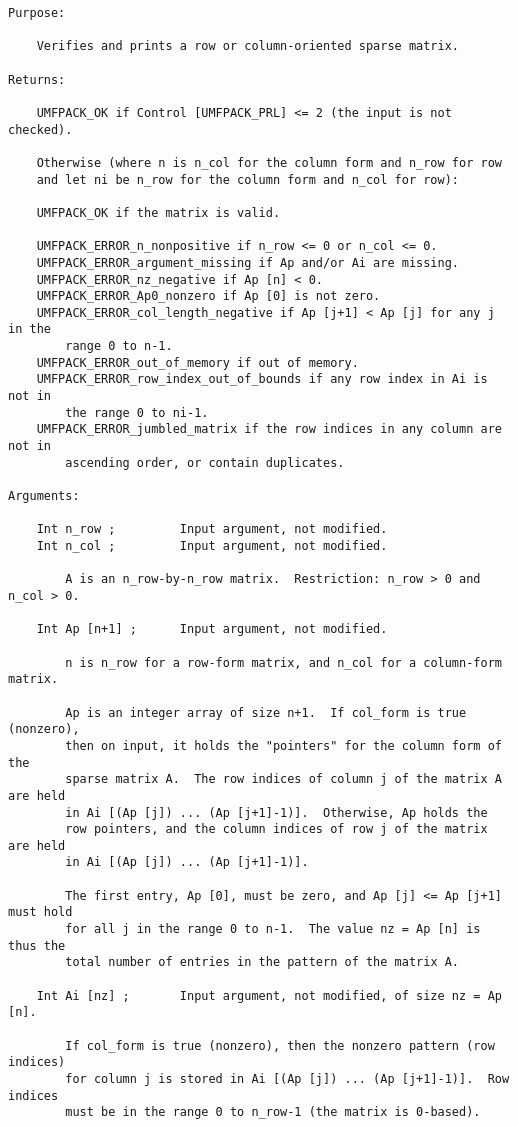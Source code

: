 {\begin{verbatim}
Purpose:

    Verifies and prints a row or column-oriented sparse matrix.

Returns:

    UMFPACK_OK if Control [UMFPACK_PRL] <= 2 (the input is not checked).

    Otherwise (where n is n_col for the column form and n_row for row
    and let ni be n_row for the column form and n_col for row):

    UMFPACK_OK if the matrix is valid.

    UMFPACK_ERROR_n_nonpositive if n_row <= 0 or n_col <= 0.
    UMFPACK_ERROR_argument_missing if Ap and/or Ai are missing.
    UMFPACK_ERROR_nz_negative if Ap [n] < 0.
    UMFPACK_ERROR_Ap0_nonzero if Ap [0] is not zero.
    UMFPACK_ERROR_col_length_negative if Ap [j+1] < Ap [j] for any j in the
        range 0 to n-1.
    UMFPACK_ERROR_out_of_memory if out of memory.
    UMFPACK_ERROR_row_index_out_of_bounds if any row index in Ai is not in
        the range 0 to ni-1.
    UMFPACK_ERROR_jumbled_matrix if the row indices in any column are not in
        ascending order, or contain duplicates.

Arguments:

    Int n_row ;         Input argument, not modified.
    Int n_col ;         Input argument, not modified.

        A is an n_row-by-n_row matrix.  Restriction: n_row > 0 and n_col > 0.

    Int Ap [n+1] ;      Input argument, not modified.

        n is n_row for a row-form matrix, and n_col for a column-form matrix.

        Ap is an integer array of size n+1.  If col_form is true (nonzero),
        then on input, it holds the "pointers" for the column form of the
        sparse matrix A.  The row indices of column j of the matrix A are held
        in Ai [(Ap [j]) ... (Ap [j+1]-1)].  Otherwise, Ap holds the
        row pointers, and the column indices of row j of the matrix are held
        in Ai [(Ap [j]) ... (Ap [j+1]-1)].

        The first entry, Ap [0], must be zero, and Ap [j] <= Ap [j+1] must hold
        for all j in the range 0 to n-1.  The value nz = Ap [n] is thus the
        total number of entries in the pattern of the matrix A.

    Int Ai [nz] ;       Input argument, not modified, of size nz = Ap [n].

        If col_form is true (nonzero), then the nonzero pattern (row indices)
        for column j is stored in Ai [(Ap [j]) ... (Ap [j+1]-1)].  Row indices
        must be in the range 0 to n_row-1 (the matrix is 0-based).


\end{verbatim}}
